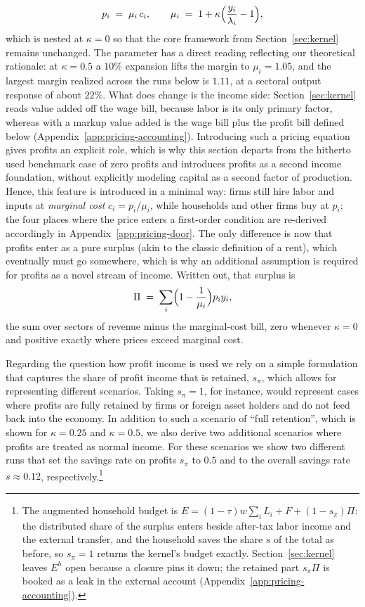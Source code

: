 \begin{equation}\label{eq:markup-door}
  p_i \;=\; \mu_i\,c_i, \qquad \mu_i \;=\; 1 + \kappa\Bigl(\frac{y_i}{\lambda_i} - 1\Bigr),
\end{equation}
which is nested at $\kappa = 0$ so that the core framework from Section~\ref{sec:kernel} remains unchanged. The parameter has a direct reading reflecting our theoretical rationale: at $\kappa = 0.5$ a $10\%$ expansion lifts the margin to $\mu_i = 1.05$, and the largest margin realized across the runs below is $1.11$, at a sectoral output response of about $22\%$. What does change is the income side: Section~\ref{sec:kernel} reads value added off the wage bill, because labor is its only primary factor, whereas with a markup value added is the wage bill plus the profit bill defined below (Appendix~\ref{app:pricing-accounting}). Introducing such a pricing equation gives profits an explicit role, which is why this section departs from the hitherto used benchmark case of zero profits and introduces profits as a second income foundation, without explicitly modeling capital as a second factor of production. Hence, this feature is introduced in a minimal way: firms still hire labor and inputs at \emph{marginal cost} $c_i = p_i/\mu_i$, while households and other firms buy at $p_i$; the
four places where the price enters a first-order condition are re-derived
accordingly in Appendix~\ref{app:pricing-door}. The only difference is now that profits enter as a pure surplus (akin to the classic definition of a rent), which eventually must go somewhere, which is why an additional assumption is required for profits as a novel stream of income.
Written out, that surplus is
\begin{equation}\label{eq:profit-bill}
  \Pi \;=\; \sum_i \Bigl(1 - \frac{1}{\mu_i}\Bigr) p_i y_i ,
\end{equation}
the sum over sectors of revenue minus the marginal-cost bill, zero whenever
$\kappa = 0$ and positive exactly where prices exceed marginal cost.

Regarding the question how profit income is used we rely on a simple formulation that captures the share of profit income that is retained, $s_\pi$, which allows for representing different scenarios. Taking $s_\pi = 1$, for instance, would represent cases where profits are fully retained by firms or foreign asset holders and do not feed back into the economy. In addition to such a scenario of ``full retention'', which is shown for $\kappa=0.25$ and $\kappa=0.5$, we also derive two additional scenarios where profits are treated as normal income. For these scenarios we show two different runs that set the savings rate on profits $s_\pi$ to $0.5$ and to the overall savings rate $s \approx 0.12$, respectively.\footnote{The augmented household budget is $E = (1-\tau)w\sum_i L_i + F + (1-s_\pi)\Pi$: the distributed share of the surplus enters beside after-tax labor income and the external transfer, and the household saves the share $s$ of the total as before, so $s_\pi = 1$ returns the kernel's budget exactly. Section~\ref{sec:kernel} leaves $E^h$ open because a closure pins it down; the retained part $s_\pi\Pi$ is booked as a leak in the external account (Appendix~\ref{app:pricing-accounting}).}

